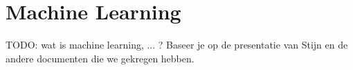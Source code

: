 \documentclass[TeamE-eindrapport]{subfiles}
\begin{document}
	
	\chapter{Machine Learning}
	
	TODO: wat is machine learning, ... ? Baseer je op de presentatie van Stijn en de andere documenten die we gekregen hebben.
	
\end{document}
